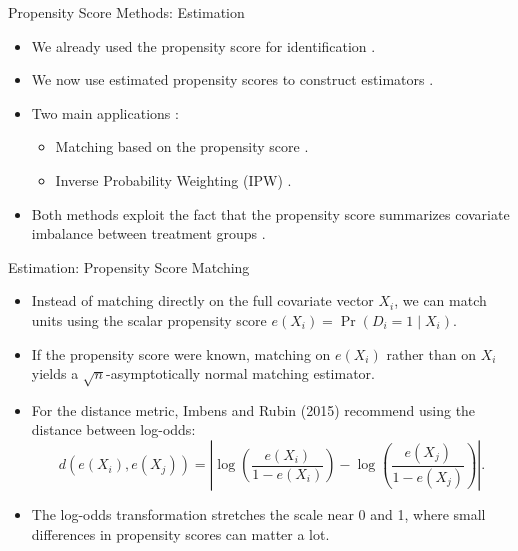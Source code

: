 \documentclass[11pt,aspectratio=169]{beamer}
\begin{document}
\begin{frame}{Propensity Score Methods: Estimation}

\begin{itemize}
    \item We already used the propensity score for identification .
    \item We now use estimated propensity scores to construct estimators .
    \item Two main applications :
    \begin{itemize}
        \item[$ \blacksquare $] Matching based on the propensity score .
        \item[$ \blacksquare $] Inverse Probability Weighting (IPW) .
    \end{itemize}
    \item Both methods exploit the fact that the propensity score summarizes covariate imbalance between treatment groups .
\end{itemize}
\end{frame}
\begin{frame}{Estimation: Propensity Score Matching}

\begin{itemize}
    \item Instead of matching directly on the full covariate vector $X_i$, we can match units using the scalar propensity score $e(X_i) = \Pr(D_i = 1 \mid X_i)$.
    \item If the propensity score were known, matching on $e(X_i)$ rather than on $X_i$ yields a $\sqrt{n}$-asymptotically normal matching estimator.
    \item For the distance metric, Imbens and Rubin (2015) recommend using the distance between log-odds:
    $$d(e(X_i), e(X_j)) = \left|\log\left(\frac{e(X_i)}{1 - e(X_i)}\right) - \log\left(\frac{e(X_j)}{1 - e(X_j)}\right)\right|.$$
    \item The log-odds transformation stretches the scale near 0 and 1, where small differences in propensity scores can matter a lot.
\end{itemize}

\end{frame}

\begin{frame}


\end{frame}
\end{document}
